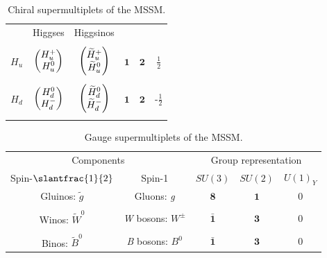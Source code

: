 \begin{table}
\begin{tabular}{cccccc}
                    & Higgses                                         & Higgsinos                                                                      &                    &              & \\ \cmidrule{2-3}\\
    $H_u$           & $\begin{pmatrix} H_u^+ \\ H_u^0\end{pmatrix}$                       & $\begin{pmatrix} \widetilde{H}_u^+ \\ \widetilde{H}_u^0\end{pmatrix}$                              & $\mathbf{1}$       & $\mathbf{2}$ & $\frac{1}{2}$\\\\
    $H_d$           & $\begin{pmatrix} H_d^0 \\ H_d^-\end{pmatrix}$                       & $\begin{pmatrix} \widetilde{H}_d^0 \\ \widetilde{H}_d^-\end{pmatrix}$                              & $\mathbf{1}$       & $\mathbf{2}$ & -$\frac{1}{2}$\\\\
    \bottomrule
  \end{tabular}
  \caption{Chiral supermultiplets of the MSSM.}
  \label{tab:chiral_supermultiplets}
\end{table}

\begin{table}
  \begin{tabular}{ccccc}
    \toprule
\multicolumn{2}{c}{Components} & \multicolumn{3}{c}{Group representation} \\ \cmidrule(r){1-2}\cmidrule(l){3-5}
Spin-$\slantfrac{1}{2}$        & Spin-1                                                                         & $SU(3)$          & $SU(2)$    & $U(1)_Y$\\\midrule
Gluinos: $\widetilde{g}$       & Gluons: \emph{g}                                                               & $\mathbf{8}$       & $\mathbf{1}$ & $0$ \\\\
Winos: $\widetilde{W}^0$       & \emph{W} bosons: $W^\pm$                                                              & $\bar{\mathbf{1}}$ & $\mathbf{3}$ & $0$\\\\
Binos: $\widetilde{B}^0$       & \emph{B} bosons: $B^0$                                                                & $\bar{\mathbf{1}}$ & $\mathbf{3}$ & $0$\\
    \bottomrule
  \end{tabular}
  \caption{Gauge supermultiplets of the MSSM.}
  \label{tab:gauge_supermultiplets}
\end{table}

